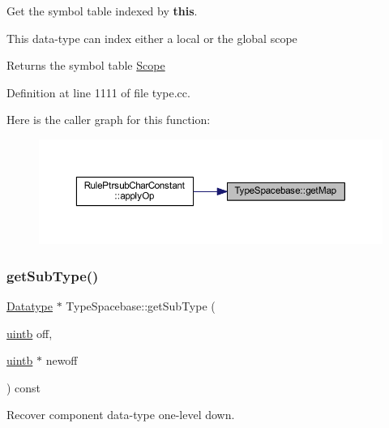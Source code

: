 Get the symbol table indexed by {\bfseries{this}}. 

This data-\/type can index either a local or the global scope \begin{DoxyReturn}{Returns}
the symbol table \mbox{\hyperlink{class_scope}{Scope}} 
\end{DoxyReturn}


Definition at line 1111 of file type.\+cc.

Here is the caller graph for this function\+:
\nopagebreak
\begin{figure}[H]
\begin{center}
\leavevmode
\includegraphics[width=350pt]{class_type_spacebase_acd0c089f2ffe851a5f10e1c63caba40c_icgraph}
\end{center}
\end{figure}
\mbox{\label{class_type_spacebase_a0dc2b2f9eadee2b8c79e2403a9c908fe}} 
\subsubsection{\texorpdfstring{getSubType()}{getSubType()}}
{\footnotesize\ttfamily \mbox{\hyperlink{class_datatype}{Datatype}} $\ast$ Type\+Spacebase\+::get\+Sub\+Type (\begin{DoxyParamCaption}\item[{\mbox{\hyperlink{types_8h_a2db313c5d32a12b01d26ac9b3bca178f}{uintb}}}]{off,  }\item[{\mbox{\hyperlink{types_8h_a2db313c5d32a12b01d26ac9b3bca178f}{uintb}} $\ast$}]{newoff }\end{DoxyParamCaption}) const\hspace{0.3cm}{\ttfamily [virtual]}}



Recover component data-\/type one-\/level down. 

